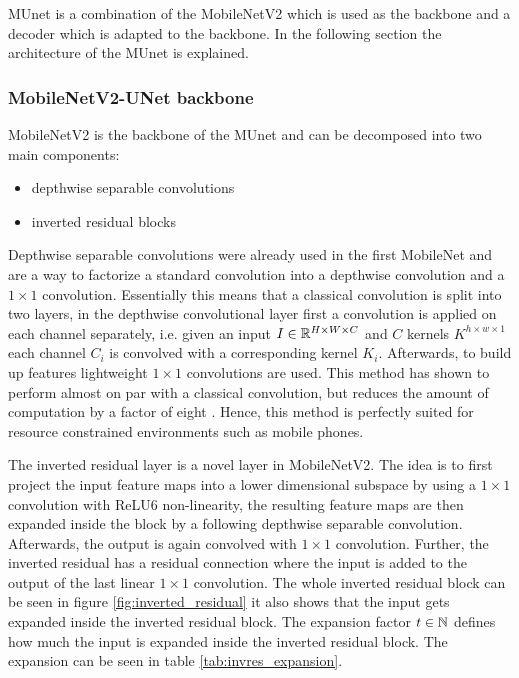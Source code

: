 \ac{MUnet} is a combination of the MobileNetV2 \cite{mnetv2} which is used as the backbone and a decoder which is adapted to the backbone.
In the following section the architecture of the \ac{MUnet} is explained.

\subsubsection{MobileNetV2-UNet backbone}

MobileNetV2 is the backbone of the \ac{MUnet} and can be decomposed into two main components:

\begin{itemize}
    \item depthwise separable convolutions
    \item inverted residual blocks
\end{itemize}

Depthwise separable convolutions were already used in the first MobileNet and are a way to factorize a standard convolution into a depthwise convolution and a $1\times1$ convolution.
Essentially this means that a classical convolution is split into two layers, in the depthwise convolutional layer first a convolution is applied on each channel separately, i.e. given an input $I \in \mathbb{R}^{H \times W \times C}$ and $C$ kernels $K^{h \times w \times 1}$ each channel $C_i$ is convolved with a corresponding kernel $K_i$.
Afterwards, to build up features lightweight $1 \times 1$ convolutions are used.
This method has shown to perform almost on par with a classical convolution, but reduces the amount of computation by a factor of eight \cite{mnetv1}.
Hence, this method is perfectly suited for resource constrained environments such as mobile phones.

The inverted residual layer is a novel layer in MobileNetV2.
The idea is to first project the input feature maps into a lower dimensional subspace by using a $1 \times 1$ convolution with ReLU6 non-linearity, the resulting feature maps are then expanded inside the block by a following depthwise separable convolution.
Afterwards, the output is again convolved with $1 \times 1$ convolution.
Further, the inverted residual has a residual connection where the input is added to the output of the last linear $1 \times 1$ convolution.
The whole inverted residual block can be seen in figure \ref{fig:inverted_residual} it also shows that the input gets expanded inside the inverted residual block.
The expansion factor $t \in \mathbb{N}$ defines how much the input is expanded inside the inverted residual block.
The expansion can be seen in table \ref{tab:invres_expansion}.

